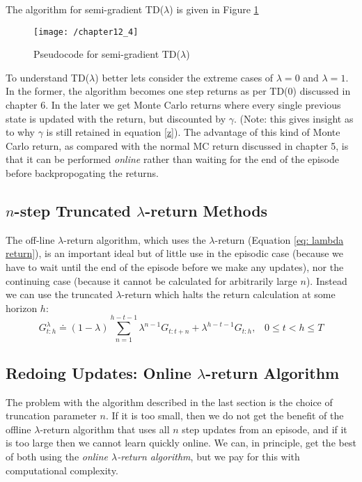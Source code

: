 The algorithm for semi-gradient TD($\lambda$) is given in Figure \ref{fig: 12_4}
\begin{figure}
	\centering
	\texttt{[image: /chapter12\_4]}
	\caption{Pseudocode for semi-gradient TD($\lambda$)}
	\label{fig: 12_4}
\end{figure}

To understand TD($\lambda$) better lets consider the extreme cases of $\lambda = 0$ and $\lambda = 1$. In the former, the algorithm becomes one step returns as per TD(0) discussed in chapter 6. In the later we get Monte Carlo returns where every single previous state is updated with the return, but discounted by $\gamma$. (Note: this gives insight as to why $\gamma$ is still retained in equation \ref{z}). The advantage of this kind of Monte Carlo return, as compared with the normal MC return discussed in chapter 5, is that it can be performed \textit{online} rather than waiting for the end of the episode before backpropogating the returns.

\subsection{$n$-step Truncated $\lambda$-return Methods}
The off-line $\lambda$-return algorithm, which uses the $\lambda$-return (Equation \ref{eq: lambda return}), is an important ideal but of little use in the episodic case (because we have to wait until the end of the episode before we make any updates), nor the continuing case (because it cannot be calculated for arbitrarily large $n$). Instead we can use the truncated $\lambda$-return which halts the return calculation at some horizon $h$:
\begin{equation} \label{eq: horizon}
G_{t:h}^\lambda \doteq (1 - \lambda) \sum_{n=1}^{h - t - 1} \lambda^{n-1} G_{t:t+n} + \lambda^{h-t-1}G_{t:h}, \; \; \; 0 \leq t < h \leq T
\end{equation}

\subsection{Redoing Updates: Online $\lambda$-return Algorithm}
The problem with the algorithm described in the last section is the choice of truncation parameter $n$. If it is too small, then we do not get the benefit of the offline $\lambda$-return algorithm that uses all $n$ step updates from an episode, and if it is too large then we cannot learn quickly online. We can, in principle, get the best of both using the \textit{online $\lambda$-return algorithm}, but we pay for this with computational complexity.

